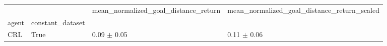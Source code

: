\begin{tabular}{llll}
\toprule
 &  & mean_normalized_goal_distance_return & mean_normalized_goal_distance_return_scaled \\
agent & constant_dataset &  &  \\
\midrule
CRL & True & 0.09 $\pm$ 0.05 & 0.11 $\pm$ 0.06 \\
\cline{1-4}
\bottomrule
\end{tabular}
